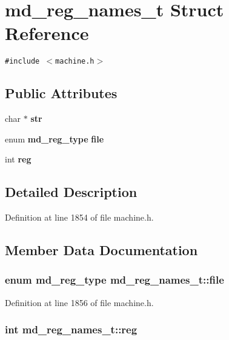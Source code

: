 \section{md\_\-reg\_\-names\_\-t Struct Reference}
\label{structmd__reg__names__t}
{\tt \#include $<$machine.h$>$}

\subsection*{Public Attributes}
\begin{CompactItemize}
\item 
char $\ast$ {\bf str}
\item 
enum {\bf md\_\-reg\_\-type} {\bf file}
\item 
int {\bf reg}
\end{CompactItemize}


\subsection{Detailed Description}


Definition at line 1854 of file machine.h.

\subsection{Member Data Documentation}
\subsubsection[{file}]{\setlength{\rightskip}{0pt plus 5cm}enum {\bf md\_\-reg\_\-type} {\bf md\_\-reg\_\-names\_\-t::file}}\label{structmd__reg__names__t_62c5506d5f90415b3d3d7cb4f84b4410}




Definition at line 1856 of file machine.h.
\subsubsection[{reg}]{\setlength{\rightskip}{0pt plus 5cm}int {\bf md\_\-reg\_\-names\_\-t::reg}}\label{structmd__reg__names__t_4e24e3d1c05375b32466906831a8db24}




